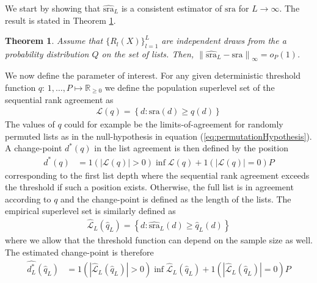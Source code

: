 \documentclass[12pt,a4paper]{article}
\DeclareMathOperator{\E}{\mathbb{E}}
\theoremstyle{plain}
\newtheorem{theorem}{Theorem}
\newtheorem{assumption}{Assumption}
\begin{document}
We start by showing that $\widehat{\textrm{sra}}_L$ is a consistent
estimator of $\textrm{sra}$ for $L \rightarrow \infty$. The result is
stated in Theorem \ref{thm:consistency}.


\begin{theorem}
  Assume that $\{R_l(X)\}_{l=1}^L$ are independent draws from the a
  probability distribution $Q$ on the set of lists.  Then,
  $\left\|\widehat{\textrm{sra}}_L - \textrm{sra}\right\|_\infty =
  o_P(1)$.
\label{thm:consistency}
\end{theorem}


We now define the parameter of interest. For any given deterministic threshold function $q\colon\, 1,\ldots,P \mapsto \mathbb{R}_{\geq 0}$
we define the population superlevel set of the sequential rank agreement as
\begin{align}
  \mathcal{L}(q) = \left\{d : \textrm{sra}(d) \geq q(d)\right\}
\end{align}
The values of $q$ could for example be the limits-of-agreement for randomly
permuted lists as in the null-hypothesis in equation (\ref{eq:permutationHypothesis}).
A change-point $d^\ast(q)$ in the list agreement is then defined by the position
\begin{align}
  d^\ast(q) &= 1\left(|\mathcal{L}(q)| > 0\right)\inf \mathcal{L}(q) + 1\left(|\mathcal{L}(q)| = 0\right)P
\end{align}
corresponding to the first list depth where the sequential rank agreement exceeds the threshold 
if such a position exists. Otherwise, the full list is in agreement according to $q$ and the change-point
is defined as the length of the lists. The empirical superlevel set is similarly defined as
\begin{align}
 \widehat{\mathcal{L}}_L(\widehat{q}_L) = \left\{d : \widehat{\textrm{sra}}_L(d) \geq \widehat{q}_L(d)\right\}
\end{align}
where we allow that the threshold function can depend on the sample size as well. The estimated change-point is therefore
\begin{align}
  \widehat{d^\ast_L}(\widehat{q}_L) &= 1(|\widehat{\mathcal{L}}_L(\widehat{q}_L)| > 0)\inf \widehat{\mathcal{L}}_L(\widehat{q}_L) + 1(|\widehat{\mathcal{L}}_L(\widehat{q}_L)| = 0)P
\end{align}
\end{document}
